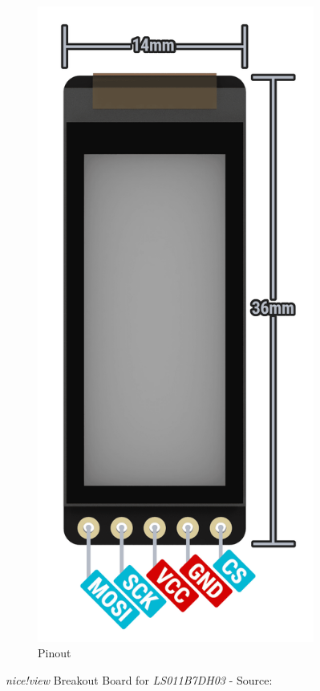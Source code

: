 \documentclass[report.tex]{subfiles}
\begin{document}
\begin{figure}[H]
\begin{subfigure}{.23\textwidth}
	\includegraphics[width=1\textwidth]{Include/Figure/comp/niceview_pinout.png}
	\caption{Pinout}
	\end{subfigure}
	\caption{\textit{nice!view} Breakout Board for \textit{LS011B7DH03} - Source: \cite{niceview}}
	\label{fig:niceview_pinout}
\end{figure}
\end{document}
